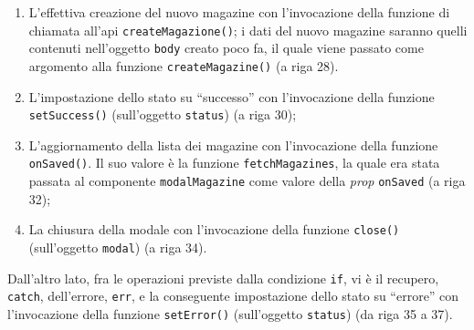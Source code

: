 \begin{enumerate}
\begin{enumerate}
            \item L'effettiva creazione del nuovo magazine con l'invocazione della funzione di chiamata all'\gls{api} \texttt{createMagazione()}; i dati del nuovo magazine saranno quelli contenuti nell'oggetto \texttt{body} creato poco fa, il quale viene passato come argomento alla funzione \texttt{createMagazine()} (a riga 28).
            
            \item L'impostazione dello stato su “successo” con l'invocazione della funzione \texttt{setSuccess()} (sull'oggetto \texttt{status}) (a riga 30); 
            
            \item L'aggiornamento della lista dei magazine con l'invocazione della funzione \texttt{onSaved()}. Il suo valore è la funzione \texttt{fetchMagazines}, la quale era stata passata al componente \texttt{modalMagazine} come valore della \textit{prop} \texttt{onSaved} (a riga 32);
            
            \item La chiusura della modale con l'invocazione della funzione \texttt{close()} (sull'oggetto \texttt{modal}) (a riga 34).
        \end{enumerate}
    Dall'altro lato, fra le operazioni previste dalla condizione \texttt{if}, vi è il recupero, \texttt{catch}, dell'errore, \texttt{err}, e la conseguente impostazione dello stato su “errore” con l'invocazione della funzione \texttt{setError()} (sull'oggetto \texttt{status}) (da riga 35 a 37).
\end{enumerate}


